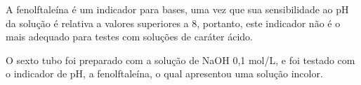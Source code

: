 		\indent A fenolftaleína é um indicador para bases, uma vez que sua sensibilidade ao pH da solução é relativa a valores superiores a 8, portanto, este indicador não é o mais adequado para testes com soluções de caráter ácido.
		
        \newpage

        \indent O sexto tubo foi preparado com a solução de NaOH 0,1 mol/L, e foi testado com o indicador de pH, a fenolftaleína, o qual apresentou uma solução incolor.
        \begin{figure}[h]
            \centering
            \qquad
            \label{fig:experimento15}
        \end{figure}
    
